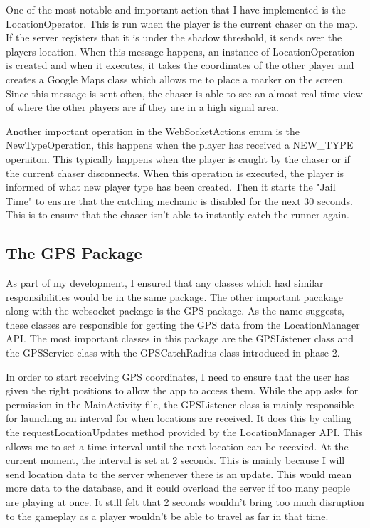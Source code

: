 \documentclass{l4proj}
\begin{document}
One of the most notable and important action that I have implemented is the LocationOperator. This is run when the player
is the current chaser on the map. If the server registers that it is under the shadow threshold, it sends over the
players location. When this message happens, an instance of LocationOperation is created and when it executes, it
takes the coordinates of the other player and creates a Google Maps class which allows me to place a marker on the
screen. Since this message is sent often, the chaser is able to see an almost real time view of where the other players
are if they are in a high signal area.

Another important operation in the WebSocketActions enum is the NewTypeOperation, this happens when the player has received
a NEW\_TYPE operaiton. This typically happens when the player is caught by the chaser or if the current chaser disconnects.
When this operation is executed, the player is informed of what new player type has been created. Then it starts the "Jail Time" to ensure that the catching mechanic is disabled for the next 30 seconds. This is to ensure that the
chaser isn't able to instantly catch the runner again.



\subsection{The GPS Package}
As part of my development, I ensured that any classes which had similar responsibilities would be in the same
package. The other important pacakage along with the websocket package is the GPS package. As the name suggests,
these classes are responsible for getting the GPS data from the LocationManager API. The most important classes
in this package are the GPSListener class and the GPSService class with the GPSCatchRadius class introduced in
phase 2.

In order to start receiving GPS coordinates, I need to ensure that the user has given the right positions to
allow the app to access them. While the app asks for permission in the MainActivity file, the GPSListener class
is mainly responsible for launching an interval for when locations are received. It does this by calling the
requestLocationUpdates method provided by the LocationManager API. This allows me to set a time interval until
the next location can be recevied. At the current moment, the interval is set at 2 seconds. This is mainly because
I will send location data to the server whenever there is an update. This would mean more data to the database, and
it could overload the server if too many people are playing at once. It still felt that 2 seconds wouldn't bring
too much disruption to the gameplay as a player wouldn't be able to travel as far in that time.
\end{document}
